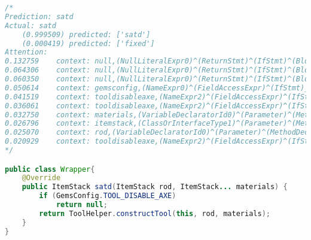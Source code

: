\begin{lstlisting}[basicstyle=\tiny,caption={Case-3 SATD}, label={},language=Java,breaklines=true,
  postbreak=\mbox{\textcolor{red}{$\hookrightarrow$}\space}]
/*
Prediction:	satd
Actual:	satd
	(0.999509) predicted: ['satd']
	(0.000419) predicted: ['fixed']
Attention:
0.132759	context: null,(NullLiteralExpr0)^(ReturnStmt)^(IfStmt)^(BlockStmt)_(ReturnStmt)_(MethodCallExpr0)_(NameExpr5),constructtool
0.064306	context: null,(NullLiteralExpr0)^(ReturnStmt)^(IfStmt)^(BlockStmt)_(ReturnStmt)_(MethodCallExpr0)_(NameExpr4),materials
0.060350	context: null,(NullLiteralExpr0)^(ReturnStmt)^(IfStmt)^(BlockStmt)_(ReturnStmt)_(MethodCallExpr0)_(ThisExpr2),this
0.050614	context: gemsconfig,(NameExpr0)^(FieldAccessExpr)^(IfStmt)_(ReturnStmt)_(NullLiteralExpr0),null
0.041519	context: tooldisableaxe,(NameExpr2)^(FieldAccessExpr)^(IfStmt)_(ReturnStmt)_(NullLiteralExpr0),null
0.036061	context: tooldisableaxe,(NameExpr2)^(FieldAccessExpr)^(IfStmt)^(BlockStmt)_(ReturnStmt)_(MethodCallExpr0)_(NameExpr5),constructtool
0.032750	context: materials,(VariableDeclaratorId0)^(Parameter)^(MethodDeclaration)_(BlockStmt)_(IfStmt)_(FieldAccessExpr0)_(NameExpr2),tooldisableaxe
0.026796	context: itemstack,(ClassOrInterfaceType1)^(Parameter)^(MethodDeclaration)_(BlockStmt)_(IfStmt)_(FieldAccessExpr0)_(NameExpr2),tooldisableaxe
0.025070	context: rod,(VariableDeclaratorId0)^(Parameter)^(MethodDeclaration)_(BlockStmt)_(IfStmt)_(FieldAccessExpr0)_(NameExpr2),tooldisableaxe
0.020929	context: tooldisableaxe,(NameExpr2)^(FieldAccessExpr)^(IfStmt)^(BlockStmt)_(ReturnStmt)_(MethodCallExpr0)_(NameExpr4),materials
*/

public class Wrapper{
    @Override
    public ItemStack satd(ItemStack rod, ItemStack... materials) {
        if (GemsConfig.TOOL_DISABLE_AXE)
            return null;
        return ToolHelper.constructTool(this, rod, materials);
    }
}
\end{lstlisting}

